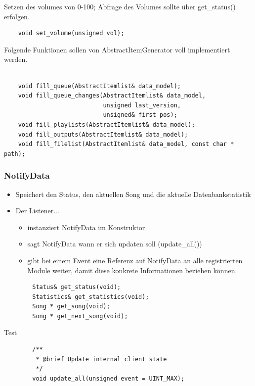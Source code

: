 Setzen des volumes von 0-100; Abfrage des Volumes sollte über get\_status() erfolgen.
\begin{verbatim}
    void set_volume(unsigned vol);
\end{verbatim}

Folgende Funktionen sollen von AbstractItemGenerator voll implementiert werden.    
\begin{verbatim}

    void fill_queue(AbstractItemlist& data_model);
    void fill_queue_changes(AbstractItemlist& data_model,
                            unsigned last_version,
                            unsigned& first_pos);
    void fill_playlists(AbstractItemlist& data_model);
    void fill_outputs(AbstractItemlist& data_model);
    void fill_filelist(AbstractItemlist& data_model, const char * path);
\end{verbatim}

\subsubsection{NotifyData}
\begin{itemize}
    \item Speichert den Status, den aktuellen Song und die aktuelle Datenbankstatistik
    \item Der Listener...
        \begin{itemize}
            \item instanziert NotifyData im Konstruktor
            \item sagt NotifyData wann er sich updaten soll (update\_all())
            \item gibt bei einem Event eine Referenz auf NotifyData an alle registrierten Module weiter,
                damit diese konkrete Informationen beziehen können.
        \end{itemize}
\end{itemize}

\begin{verbatim}
        Status& get_status(void);
        Statistics& get_statistics(void);
        Song * get_song(void);
        Song * get_next_song(void);
\end{verbatim}

Test
\begin{verbatim}
        /**
         * @brief Update internal client state
         */
        void update_all(unsigned event = UINT_MAX);
\end{verbatim}


